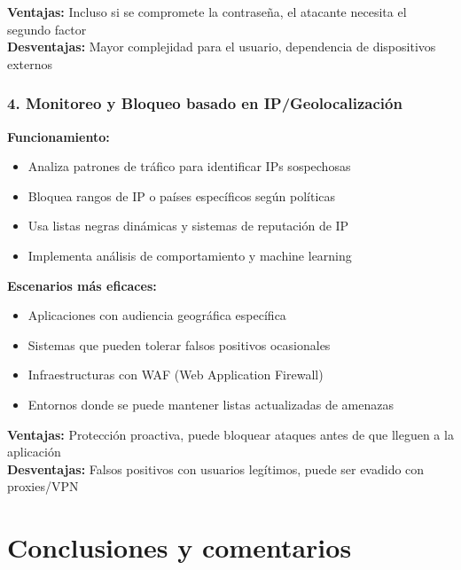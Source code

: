 \documentclass[letter,12pt]{article}
\begin{document}
\textbf{Ventajas:} Incluso si se compromete la contraseña, el atacante necesita el segundo factor \\
\textbf{Desventajas:} Mayor complejidad para el usuario, dependencia de dispositivos externos

\subsubsection{4. Monitoreo y Bloqueo basado en IP/Geolocalización}

\textbf{Funcionamiento:}
\begin{itemize}
    \item Analiza patrones de tráfico para identificar IPs sospechosas
    \item Bloquea rangos de IP o países específicos según políticas
    \item Usa listas negras dinámicas y sistemas de reputación de IP
    \item Implementa análisis de comportamiento y machine learning
\end{itemize}

\textbf{Escenarios más eficaces:}
\begin{itemize}
    \item Aplicaciones con audiencia geográfica específica
    \item Sistemas que pueden tolerar falsos positivos ocasionales
    \item Infraestructuras con WAF (Web Application Firewall)
    \item Entornos donde se puede mantener listas actualizadas de amenazas
\end{itemize}

\textbf{Ventajas:} Protección proactiva, puede bloquear ataques antes de que lleguen a la aplicación \\
\textbf{Desventajas:} Falsos positivos con usuarios legítimos, puede ser evadido con proxies/VPN


\section*{Conclusiones y comentarios}
\end{document}
